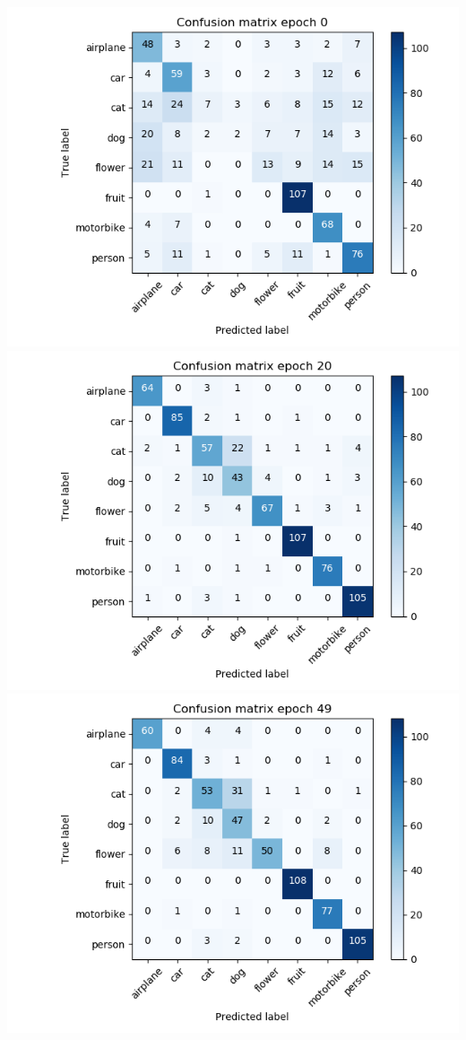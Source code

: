 \documentclass{article}
\begin{document}
\begin{minipage}[c]{\textwidth}
	\includegraphics[width= \figureWidth\textwidth]{./figures/cm_h32_w32_r_none_e0.png}
	\includegraphics[width= \figureWidth\textwidth]{./figures/cm_h32_w32_r_none_e20.png}
	\includegraphics[width= \figureWidth\textwidth]{./figures/cm_h32_w32_r_none_e49.png}

\end{minipage}
\end{document}
